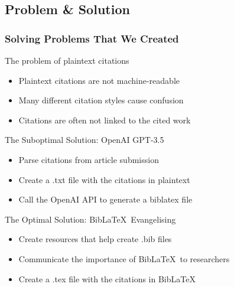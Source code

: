 \documentclass[aspectratio=169,9pt,xcolor=dvipsnames]{beamer}
\begin{document}
\subsection{Problem \& Solution}
\begin{frame}[t]
    \frametitle{Solving Problems That We Created}
    \begin{block}{The problem of plaintext citations}
        \begin{itemize}
            \item Plaintext citations are not machine-readable
            \item Many different citation styles cause confusion
            \item Citations are often not linked to the cited work
        \end{itemize}
    \end{block}
    \begin{block}{The Suboptimal Solution: OpenAI GPT-3.5}
        \begin{itemize}
            \item Parse citations from article submission
            \item Create a .txt file with the citations in plaintext
            \item Call the OpenAI API to generate a biblatex file
        \end{itemize}
    \end{block}
\begin{block}{The Optimal Solution: Bib\LaTeX\ Evangelising}
    \begin{itemize}
        \item Create resources that help create .bib files
        \item Communicate the importance of Bib\LaTeX\ to researchers
        \item Create a .tex file with the citations in BibLaTeX
    \end{itemize}


\end{block}
\centering
\end{frame}

\end{document}

